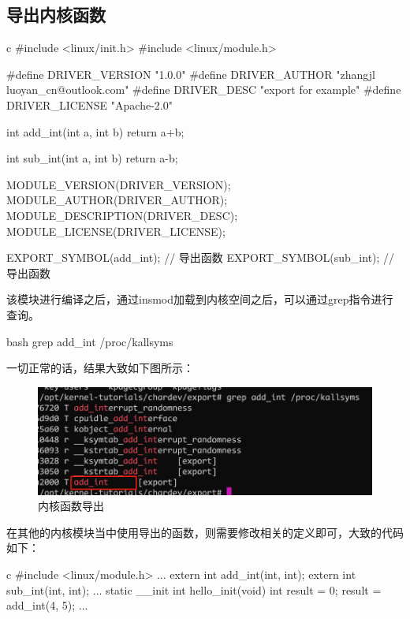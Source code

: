 \subsection{导出内核函数}
\begin{code-block}{c}
#include <linux/init.h>
#include <linux/module.h>

#define DRIVER_VERSION  "1.0.0"
#define DRIVER_AUTHOR   "zhangjl luoyan_cn@outlook.com"
#define DRIVER_DESC     "export for example"
#define DRIVER_LICENSE  "Apache-2.0"

int add_int(int a, int b)
{
        return a+b;
}

int sub_int(int a, int b)
{
        return a-b;
}

MODULE_VERSION(DRIVER_VERSION);
MODULE_AUTHOR(DRIVER_AUTHOR);
MODULE_DESCRIPTION(DRIVER_DESC);
MODULE_LICENSE(DRIVER_LICENSE);

EXPORT_SYMBOL(add_int); // 导出函数
EXPORT_SYMBOL(sub_int); // 导出函数
\end{code-block}

该模块进行编译之后，通过insmod加载到内核空间之后，可以通过grep指令进行查询。
\begin{code-block}{bash}
grep add_int /proc/kallsyms
\end{code-block}
一切正常的话，结果大致如下图所示：
\begin{figure}[H]
  \centering
  \includegraphics[width=\linewidth]{export.png}
  \caption{内核函数导出}
  \label{fig:export}
\end{figure}

在其他的内核模块当中使用导出的函数，则需要修改相关的定义即可，大致的代码如下：
\begin{code-block}{c}
#include <linux/module.h>
...
extern int add_int(int, int);
extern int sub_int(int, int);
...
static __init int hello_init(void)
{
    int result = 0;
    result = add_int(4, 5);
...
}
\end{code-block}

